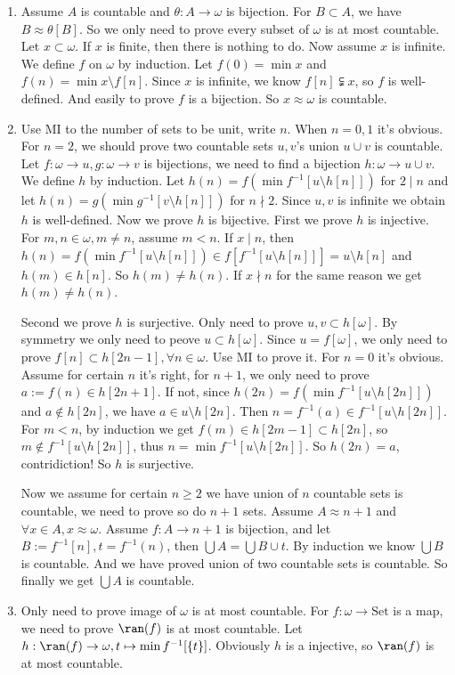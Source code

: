 \documentclass{ctexart}
\begin{document}
\begin{solution}
 \begin{enumerate}
  \item Assume $A$ is countable and $\theta:A\to \omega$ is bijection. For $B\subset A$, we have $B\approx \theta[B]$. So we only need to prove every subset of $\omega$ is at most countable. Let $x\subset \omega$. If $x$ is finite, then there is nothing to do. Now assume $x$ is infinite. We define $f$ on $\omega$ by induction. Let $f(0)=\min x$ and $f(n)=\min x\setminus f[n]$. Since $x$ is infinite, we know $f[n]\subsetneqq x$, so $f$ is well-defined. And easily to prove $f$ is a bijection. So $x\approx \omega$ is countable. 
  \item Use MI to the number of sets to be unit, write $n$. When $n=0,1$ it's obvious. For $n=2$, we should prove two countable sets $u,v$'s union $u\cup v$ is countable. Let $f:\omega\to u,g:\omega\to v$ is bijections, we need to find a bijection $h:\omega\to u\cup v$. 
  We define $h$ by induction. Let $h(n)=f(\min f^{-1}[u\setminus h[n]])$ for $2\mid n$ and let $h(n)=g(\min g^{-1}[v\setminus h[n]])$ for $n\nmid 2$. Since $u,v$ is infinite we obtain $h$ is well-defined. 
  Now we prove $h$ is bijective. First we prove $h$ is injective. For $m,n\in \omega,m\neq n$, assume $m<n$. If $x\mid n$, then $h(n)=f(\min f^{-1}[u\setminus h[n]])\in f[f^{-1}[u\setminus h[n]]]=u\setminus h[n]$ and $h(m)\in h[n]$. So $h(m)\neq h(n)$. If $x\nmid n$ for the same reason we get $h(m)\neq h(n)$. 

  Second we prove $h$ is surjective. Only need to prove $u,v\subset h[\omega]$. By symmetry we only need to peove $u\subset h[\omega]$. Since $u=f[\omega]$, we only need to prove $f[n]\subset h[2n-1],\forall n\in \omega$. Use MI to prove it. For $n=0$ it's obvious. Assume for certain $n$ it's right, for $n+1$, we only need to prove $a:=f(n)\in h[2n+1]$. If not, since $h(2n)=f(\min f^{-1}[u\setminus h[2n]])$ and $a\notin h[2n]$, we have $a\in u\setminus h[2n]$. Then $n=f^{-1}(a)\in f^{-1}[u\setminus h[2n]]$. For $m<n$, by induction we get $f(m)\in h[2m-1]\subset h[2n]$, so $m\notin f^{-1}[u\setminus h[2n]]$, thus $n=\min f^{-1}[u\setminus h[2n]]$. So $h(2n)=a$, contridiction! So $h$ is surjective. 

  Now we assume for certain $n\geq 2$ we have union of $n$ countable sets is countable, we need to prove so do $n+1$ sets. Assume $A\approx n+1$ and $\forall x\in A,x\approx \omega$. Assume $f:A\to n+1$ is bijection, and let $B:=f^{-1}[n],t=f^{-1}(n)$, then $\bigcup A=\bigcup B \cup t$. By induction we know $\bigcup B$ is countable. And we have proved union of two countable sets is countable. So finally we get $\bigcup A$ is countable. 
  \item Only need to prove image of $\omega$ is at most countable. For $f:\omega\to \mathrm{Set}$ is a map, we need to prove $\ran(f)$ is at most countable. Let $h:\ran(f)\to \omega,t\mapsto \min f^{-1}[\{t\}]$. Obviously $h$ is a injective, so $\ran(f)$ is at most countable. 
 \end{enumerate}
\end{solution}
\end{document}
